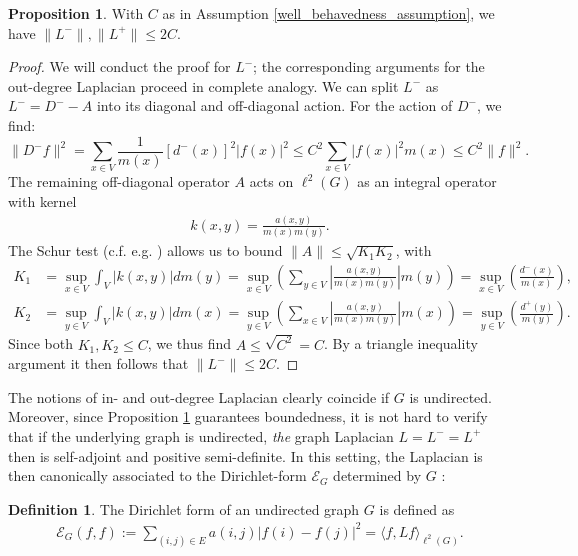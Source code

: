 \documentclass[reqno,12pt,letterpaper]{amsart}
\numberwithin{equation}{section}
\newcommand{\din}{d^{-}}
\newcommand{\dout}{d^{+}}
\newcommand{\Lin}{L^{-}}
\newcommand{\Lout}{L^{+}}
\newcommand{\1}{\mathds{1}}
\theoremstyle{definition}
\newtheorem{Prop}[Th]{Proposition}
\newtheorem{Def}[Th]{Definition}
\begin{document}
\begin{Prop}\label{tame_Laplacians}
With $C$ as in Assumption \ref{well_behavedness_assumption}, we have 	$\|\Lin\|, \|\Lout\| \leq 2C$. 
\end{Prop}
\begin{proof}
We will conduct the proof for $\Lin$; the corresponding arguments for the out-degree Laplacian proceed in complete analogy. We can split $\Lin$ as $\Lin = D^{-}-A$ into its diagonal and off-diagonal action. For the action of $D^{-}$, we find:
\begin{equation}
	\|D^{-} f\|^2 = \sum\limits_{x \in V} \frac{1}{m(x)} [\din(x)]^2 |f(x)|^2 \leq C^2   \sum\limits_{x \in V}   |f(x)|^2 m(x)  \leq C^2 \|f\|^2. 
\end{equation}
The remaining off-diagonal operator $A$ acts on $\ell^2(G)$ as an integral operator with kernel 
\begin{align}
	k(x,y) = \frac{a(x,y)}{m(x) m(y)}.
\end{align}
The Schur test (c.f. e.g. \cite[Theorem 5.2]{HalmosSunder1978}) allows us to bound $\|A\| \leq \sqrt{K_1K_2}$, with 
\begin{align}
K_1 &=	\sup\limits_{x \in V} \int_V |k(x,y)| dm(y)= \sup\limits_{x \in V} \left( \sum\limits_{y \in V} \left| \frac{a(x,y)}{m(x) m(y)} \right| m(y) \right) = 
	\sup\limits_{x \in V} \left( \frac{\din(x)}{m(x)} \right),\\
K_2 &=	\sup\limits_{y \in V} \int_V |k(x,y)| dm(x)= \sup\limits_{y \in V} \left( \sum\limits_{x \in V} \left| \frac{a(x,y)}{m(x) m(y)}\right|  m(x) \right) = 
	\sup\limits_{y \in V} \left( \frac{\dout(y)}{m(y)} \right).
\end{align}
Since both $K_1,K_2 \leq C$, we thus find $A \leq \sqrt{C^2} = C$. By a triangle inequality argument it then follows that $\|\Lin\| \leq 2C$. 
\end{proof}

The notions of in- and out-degree Laplacian clearly coincide if $G$
 is undirected. Moreover, since Proposition \ref{tame_Laplacians} guarantees boundedness, it is not hard to verify that if the underlying graph is undirected, \emph{the} graph Laplacian $L = \Lin = \Lout$ then is self-adjoint and positive semi-definite. In this setting, the Laplacian is then canonically associated to the Dirichlet-form $\mathcal{E}_G$ determined by $G$ \cite{KostenkoNicolussi2023}:
\begin{Def}
	The Dirichlet form of an undirected graph $G$ is defined as 
	\begin{align}\label{dirichlet_form}
		\mathcal{E}_G(f,f) :=  \sum\limits_{(i,j) \in E} a(i,j) |f(i) - f(j)|^2 = \langle f, L f\rangle_{\ell^2(G)}.
	\end{align}
\end{Def}
\end{document}
